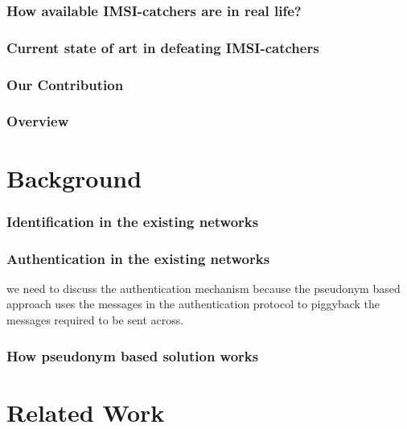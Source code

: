 \documentclass{llncs} %
\begin{document}
\subsubsection{How available IMSI-catchers are in real life?}

\subsubsection{Current state of art in defeating IMSI-catchers}

\subsubsection{Our Contribution}

\subsubsection{Overview}


\section{Background}

\subsubsection{Identification in the existing networks}
\subsubsection{Authentication in the existing networks} we need to discuss the authentication mechanism because the pseudonym based approach uses the messages in the authentication protocol to piggyback the messages required to be sent across.
\subsubsection{How pseudonym based solution works}

\section{Related Work}
\end{document}
